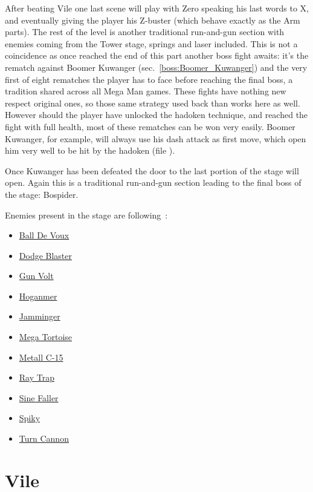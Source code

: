 After beating Vile one last scene will play with Zero speaking his last words to X, and eventually giving the player his Z-buster (which behave exactly as the Arm parts). The rest of the level is another traditional run-and-gun section with enemies coming from the Tower stage, springs and laser included. This is not a coincidence as once reached the end of this part another boss fight awaits: it's the rematch against Boomer Kuwanger (sec.~\ref{boss:Boomer_Kuwanger}) and the very first of eight rematches the player has to face before reaching the final boss, a tradition shared across all Mega Man games. These fights have nothing new respect original ones, so those same strategy used back than works here as well. However should the player have unlocked the hadoken technique, and reached the fight with full health, most of these rematches can be won very easily. Boomer Kuwanger, for example, will always use his dash attack as first move, which open him very well to be hit by the hadoken (file ).

Once Kuwanger has been defeated the door to the last portion of the stage will open. Again this is a traditional run-and-gun section leading to the final boss of the stage: Bospider.

Enemies present in the stage are following~\cite{wiki:sigma_stages}:
\begin{itemize}
	\item \hyperlink {enem:Ball_De_Voux}{Ball De Voux}
	\item \hyperlink {enem:Dodge_Blaster}{Dodge Blaster}
	\item \hyperlink {enem:Gun_Volt}{Gun Volt}
	\item \hyperlink {enem:Hoganmer}{Hoganmer}
	\item \hyperlink {enem:Jamminger}{Jamminger}
	\item \hyperlink {enem:Mega_Tortoise}{Mega Tortoise}
	\item \hyperlink {enem:Metall_C-15}{Metall C-15}
	\item \hyperlink {enem:Ray_Trap}{Ray Trap}
	\item \hyperlink {enem:Sine_Faller}{Sine Faller}
	\item \hyperlink {enem:Spiky}{Spiky}
	\item \hyperlink {enem:Turn_Cannon}{Turn Cannon}
\end{itemize}

\section{Vile}\label{boss:vile}

